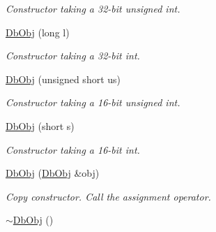 \begin{CompactItemize}
\begin{CompactList}\small\item\em Constructor taking a 32-bit unsigned int. \item\end{CompactList}\item 
\hypertarget{classutil_1_1DbObj_6e0111e212b37df66882bdb72e9c8c6c}{
\hyperlink{classutil_1_1DbObj_6e0111e212b37df66882bdb72e9c8c6c}{DbObj} (long l)}
\label{classutil_1_1DbObj_6e0111e212b37df66882bdb72e9c8c6c}

\begin{CompactList}\small\item\em Constructor taking a 32-bit int. \item\end{CompactList}\item 
\hypertarget{classutil_1_1DbObj_457d23bfb694740c2218bd5040e35447}{
\hyperlink{classutil_1_1DbObj_457d23bfb694740c2218bd5040e35447}{DbObj} (unsigned short us)}
\label{classutil_1_1DbObj_457d23bfb694740c2218bd5040e35447}

\begin{CompactList}\small\item\em Constructor taking a 16-bit unsigned int. \item\end{CompactList}\item 
\hypertarget{classutil_1_1DbObj_bf2739aefeef09b66ff61afc3e265c80}{
\hyperlink{classutil_1_1DbObj_bf2739aefeef09b66ff61afc3e265c80}{DbObj} (short s)}
\label{classutil_1_1DbObj_bf2739aefeef09b66ff61afc3e265c80}

\begin{CompactList}\small\item\em Constructor taking a 16-bit int. \item\end{CompactList}\item 
\hypertarget{classutil_1_1DbObj_7b47bfe0c0e78e0f422ea07e2610fe14}{
\hyperlink{classutil_1_1DbObj_7b47bfe0c0e78e0f422ea07e2610fe14}{DbObj} (\hyperlink{classutil_1_1DbObj}{DbObj} \&obj)}
\label{classutil_1_1DbObj_7b47bfe0c0e78e0f422ea07e2610fe14}

\begin{CompactList}\small\item\em Copy constructor. Call the assignment operator. \item\end{CompactList}\item 
\hypertarget{classutil_1_1DbObj_19e815572aa7cfd9e46f28d5773249d4}{
\hyperlink{classutil_1_1DbObj_19e815572aa7cfd9e46f28d5773249d4}{$\sim$DbObj} ()}
\label{classutil_1_1DbObj_19e815572aa7cfd9e46f28d5773249d4}


\end{CompactItemize}
